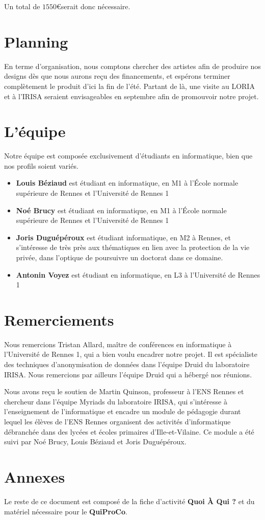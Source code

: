 \documentclass[a4paper]{article}
\begin{document}
Un total de $1550$\euro \space serait donc nécessaire.

\section*{Planning}

En terme d'organisation, nous comptons chercher des artistes afin de produire nos designs dès que nous aurons reçu des financements, et espérons terminer complètement le produit d'ici la fin de l'été.
Partant de là, une visite au LORIA et à l'IRISA seraient envisageables en septembre afin de promouvoir notre projet.

\section*{L'équipe}

Notre équipe est composée exclusivement d'étudiants en informatique, bien que nos profils soient variés.
\begin{itemize}
	\item \textbf{Louis Béziaud} est étudiant en informatique, en M1 à l'École normale supérieure de Rennes et l'Université de Rennes 1
	\item \textbf{Noé Brucy} est étudiant en informatique, en M1 à l'École normale supérieure de Rennes et l'Université de Rennes 1
	\item \textbf{Joris Duguépéroux} est étudiant informatique, en M2 à Rennes, et s'intéresse de très près aux thématiques en lien avec la protection de la vie privée, dans l'optique de poursuivre un doctorat dans ce domaine.
	\item \textbf{Antonin Voyez} est étudiant en informatique, en L3 à l'Université de Rennes 1
\end{itemize}

\section*{Remerciements}

Nous remercions Tristan Allard, maître de conférences en informatique à l'Université de Rennes 1, qui a bien voulu encadrer notre projet. Il est spécialiste des techniques d'anonymisation de données dans l'équipe Druid du laboratoire IRISA. Nous remercions par ailleurs l'équipe Druid qui a hébergé nos réunions.

Nous avons reçu le soutien de Martin Quinson, professeur à l'ENS Rennes et chercheur dans l'équipe Myriads du laboratoire IRISA, qui s'intéresse à l'enseignement de l'informatique et encadre un module de pédagogie durant lequel les élèves de l'ENS Rennes organisent des activités d'informatique débranchée dans des lycées et écoles primaires d'Ille-et-Vilaine. Ce module a été suivi par Noé Brucy, Louis Béziaud et Joris Duguépéroux.

\appendix
\section*{Annexes}

Le reste de ce document est composé de la fiche d'activité \textbf{Quoi À Qui ?} et du matériel nécessaire pour le \textbf{QuiProCo}.



\end{document}
